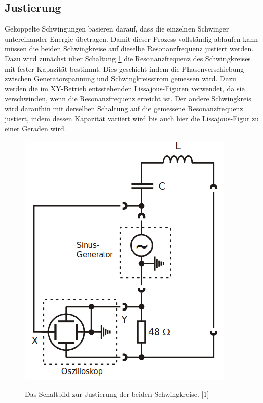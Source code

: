\documentclass[titlepage = firstcover]{scrartcl}
\begin{document}
    \subsection{Justierung}
        Gekoppelte Schwingungen basieren darauf, dass die einzelnen Schwinger untereinander Energie übetragen. Damit dieser Prozess vollständig ablaufen kann
        müssen die beiden Schwingkreise auf dieselbe Resonanzfrequenz justiert werden. Dazu wird zunächst über Schaltung \ref{fig:Justierung} die 
        Resonanzfrequenz des Schwingkreises mit fester Kapazität bestimmt. Dies geschieht indem die Phasenverschiebung zwischen Generatorspannung und 
        Schwingkreisstrom gemessen wird. Dazu werden die im XY-Betrieb entsstehenden Lissajous-Figuren verwendet, da sie verschwinden, wenn die 
        Resonanzfrequenz erreicht ist. Der andere Schwingkreis wird daraufhin mit derselben Schaltung auf die gemessene Resonanzfrequenz justiert, indem 
        dessen Kapazität variiert wird bis auch hier die Lissajous-Figur zu einer Geraden wird.
        \begin{figure}[h]
            \centering
            \caption{Das Schaltbild zur Justierung der beiden Schwingkreise. [1]}
            \includegraphics[width = 0.4\linewidth]{Justierung.png}
            \label{fig:Justierung}
        \end{figure}
\end{document}
